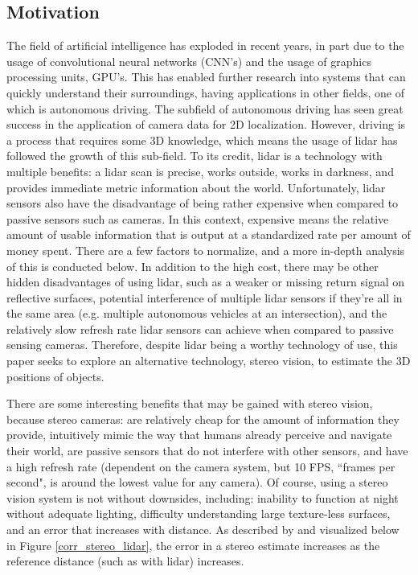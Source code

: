 \subsection{Motivation}
The field of artificial intelligence has exploded in recent years, in part due to the usage of convolutional neural networks (CNN's) and the usage of graphics processing units, GPU's. This has enabled further research into systems that can quickly understand their surroundings, having applications in other fields, one of which is autonomous driving. The subfield of autonomous driving has seen great success in the application of camera data for 2D localization. However, driving is a process that requires some 3D knowledge, which means the usage of lidar has followed the growth of this sub-field. To its credit, lidar is a technology with multiple benefits: a lidar scan is precise, works outside, works in darkness, and provides immediate metric information about the world. Unfortunately, lidar sensors also have the disadvantage of being rather expensive when compared to passive sensors such as cameras. In this context, expensive means the relative amount of usable information that is output at a standardized rate per amount of money spent. There are a few factors to normalize, and a more in-depth analysis of this is conducted below. In addition to the high cost, there may be other hidden disadvantages of using lidar, such as a weaker or missing return signal on reflective surfaces, potential interference of multiple lidar sensors if they're all in the same area (e.g. multiple autonomous vehicles at an intersection), and the relatively slow refresh rate lidar sensors can achieve when compared to passive sensing cameras. Therefore, despite lidar being a worthy technology of use, this paper seeks to explore an alternative technology, stereo vision, to estimate the 3D positions of objects.

There are some interesting benefits that may be gained with stereo vision, because stereo cameras: are relatively cheap for the amount of information they provide, intuitively mimic the way that humans already perceive and navigate their world, are passive sensors that do not interfere with other sensors, and have a high refresh rate (dependent on the camera system, but 10 FPS, ``frames per second", is around the lowest value for any camera). Of course, using a stereo vision system is not without downsides, including: inability to function at night without adequate lighting, difficulty understanding large texture-less surfaces, and an error that increases with distance. As described by \cite{wang_pseudo-lidar_2019} and visualized below in Figure \ref{corr_stereo_lidar}, the error in a stereo estimate increases as the reference distance (such as with lidar) increases. %

